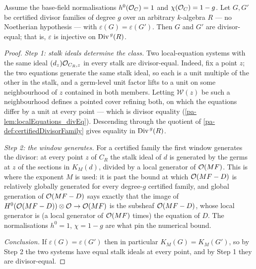 \begin{theorem}
  \label{pa-thm:divFam_mono}
  \leanok

  Assume the base-field normalisations \(h^0(\mathcal{O}_{C}) = 1\) and
  \(\chi(\mathcal{O}_{C}) = 1 - g\). Let \(G, G'\) be certified divisor families of degree \(g\)
  over an arbitrary \(k\)-algebra \(R\) --- no Noetherian hypothesis --- with
  \(\varepsilon(G) = \varepsilon(G')\). Then \(G\) and \(G'\) are divisor-equal; that is,
  \(\varepsilon\) is injective on \(\operatorname{Div}^{\,g}(R)\).
\end{theorem}
\begin{proof}
  \leanok
  \emph{Step 1: stalk ideals determine the class.} Two local-equation systems with the same
  ideal \((d_z)\mathcal{O}_{C_R,z}\) in every stalk are divisor-equal. Indeed, fix a point
  \(z\); the two equations generate the same stalk ideal, so each is a unit multiple of the
  other in the stalk, and a germ-level unit factor lifts to a unit on some neighbourhood of
  \(z\) contained in both members. Letting \(\mathcal W(z)\) be such a neighbourhood defines
  a pointed cover refining both, on which the equations differ by a unit at every point ---
  which is divisor equality (\ref{pa-lem:localEquations_divEq}). Descending through the
  quotient of \ref{pa-def:certifiedDivisorFamily} gives equality in \(\operatorname{Div}^{\,g}(R)\).

  \emph{Step 2: the window generates.} For a certified family the first window generates the
  divisor: at every point \(z\) of \(C_R\) the stalk ideal of \(d\) is generated by the
  germs at \(z\) of the sections in \(K_M(d)\), divided by a local generator of
  \(\mathcal{O}(MF)\). This is where the exponent \(M\) is used: it is past the bound at which
  \(\mathcal{O}(MF - D)\) is relatively globally generated for every degree-\(g\) certified family,
  and global generation of \(\mathcal{O}(MF-D)\) says exactly that the image of
  \(H^0(\mathcal{O}(MF-D)) \otimes \mathcal{O}_{} \to \mathcal{O}(MF)\) is the subsheaf \(\mathcal{O}(MF-D)\), whose
  local generator is (a local generator of \(\mathcal{O}(MF)\) times) the equation of \(D\). The
  normalisations \(h^0 = 1\), \(\chi = 1-g\) are what pin the numerical bound.

  \emph{Conclusion.} If \(\varepsilon(G) = \varepsilon(G')\) then in particular
  \(K_M(G) = K_M(G')\), so by Step 2 the two systems have equal stalk ideals at every
  point, and by Step 1 they are divisor-equal.
\end{proof}

